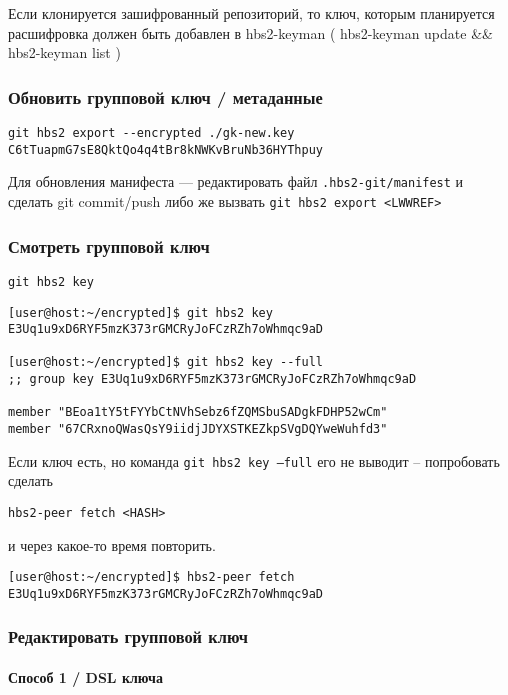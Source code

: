 \documentclass[11pt,a4paper]{article}
\begin{document}
Если клонируется зашифрованный репозиторий, то ключ, которым планируется
расшифровка должен быть добавлен в hbs2-keyman ( hbs2-keyman update \&\& hbs2-keyman list )

\subsubsection{Обновить групповой ключ / метаданные}

\begin{verbatim}
git hbs2 export --encrypted ./gk-new.key  C6tTuapmG7sE8QktQo4q4tBr8kNWKvBruNb36HYThpuy
\end{verbatim}

Для обновления манифеста --- редактировать файл \texttt{.hbs2-git/manifest} и сделать
git commit/push либо же вызвать \texttt{git hbs2 export <LWWREF>}

\subsubsection{Смотреть групповой ключ}

\texttt{git hbs2 key}

\begin{verbatim}
[user@host:~/encrypted]$ git hbs2 key
E3Uq1u9xD6RYF5mzK373rGMCRyJoFCzRZh7oWhmqc9aD

[user@host:~/encrypted]$ git hbs2 key --full
;; group key E3Uq1u9xD6RYF5mzK373rGMCRyJoFCzRZh7oWhmqc9aD

member "BEoa1tY5tFYYbCtNVhSebz6fZQMSbuSADgkFDHP52wCm"
member "67CRxnoQWasQsY9iidjJDYXSTKEZkpSVgDQYweWuhfd3"

\end{verbatim}

Если ключ есть, но команда \texttt{git hbs2 key --full} его не выводит --
попробовать сделать

\texttt{hbs2-peer fetch <HASH>}

и через какое-то время повторить.

\begin{verbatim}
[user@host:~/encrypted]$ hbs2-peer fetch E3Uq1u9xD6RYF5mzK373rGMCRyJoFCzRZh7oWhmqc9aD
\end{verbatim}

\subsubsection{Редактировать групповой ключ}

\paragraph{Способ 1 / DSL ключа}
\end{document}
